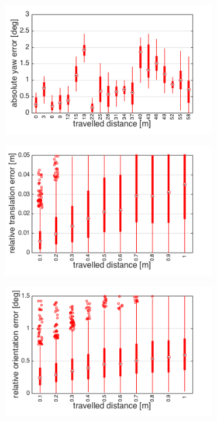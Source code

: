 \begin{figure}[h]
\begin{subfigure}[b]{0.45\textwidth}
    \caption{}
  \end{subfigure}
  \hfill
  \begin{subfigure}[b]{0.45\textwidth}
    \includegraphics[width=\textwidth]{images/euroc/aoe_y.png}
    \caption{}
  \end{subfigure}
  \begin{subfigure}[b]{0.45\textwidth}
    \includegraphics[width=\textwidth]{images/euroc/rte.png}
    \caption{}
  \end{subfigure}
  \hfill
  \begin{subfigure}[b]{0.45\textwidth}
    \includegraphics[width=\textwidth]{images/euroc/roe.png}

\end{subfigure}
\end{figure}
